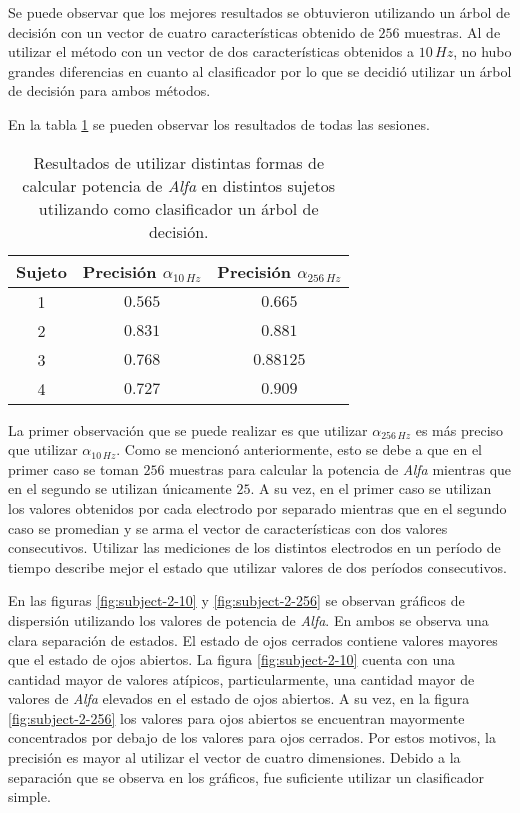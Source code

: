 Se puede observar que los mejores resultados se obtuvieron utilizando un árbol de decisión con un vector de cuatro características obtenido de $256$ muestras. Al de utilizar el método con un vector de dos características obtenidos a $10 \, Hz$, no hubo grandes diferencias en cuanto al clasificador por lo que se decidió utilizar un árbol de decisión para ambos métodos.

En la tabla \ref{tab:eeg-results} se pueden observar los resultados de todas las sesiones.

\begin{table}[H]
\centering
\begin{tabular}{ |c|c|c| } 
 \hline
 Sujeto & Precisión $\alpha_{10 \, Hz}$ &  Precisión $\alpha_{256 \, Hz}$ \\ 
 \hline
 1 & $0.565$ & $0.665$ \\
 \hline
 2 & $0.831$ & $0.881$ \\
 \hline
 3 & $0.768$ & $0.88125$ \\
 \hline
4  & $0.727$ & $0.909$ \\
 \hline



 \hline
\end{tabular}
\caption{Resultados de utilizar distintas formas de calcular potencia de \emph{Alfa} en distintos sujetos utilizando como clasificador un árbol de decisión.}
\label{tab:eeg-results}
\end{table}

La primer observación que se puede realizar es que utilizar $\alpha_{256 \, Hz}$ es más preciso que utilizar $\alpha_{10 \, Hz}$. Como se mencionó anteriormente, esto se debe a que en el primer caso se toman $256$ muestras para calcular la potencia de \emph{Alfa} mientras que en el segundo se utilizan únicamente $25$. A su vez, en el primer caso se utilizan los valores obtenidos por cada electrodo por separado mientras que en el segundo caso se promedian y se arma el vector de características con dos valores consecutivos. Utilizar las mediciones de los distintos electrodos en un período de tiempo describe mejor el estado que utilizar valores de dos períodos consecutivos.

En las figuras \ref{fig:subject-2-10} y \ref{fig:subject-2-256} se observan gráficos de dispersión utilizando los valores de potencia de \emph{Alfa}. En ambos se observa una clara separación de estados. El estado de ojos cerrados contiene valores mayores que el estado de ojos abiertos. La figura \ref{fig:subject-2-10} cuenta con una cantidad mayor de valores atípicos, particularmente, una cantidad mayor de valores de \emph{Alfa} elevados en el estado de ojos abiertos. A su vez, en la figura \ref{fig:subject-2-256} los valores para ojos abiertos se encuentran mayormente concentrados por debajo de los valores para ojos cerrados. Por estos motivos, la precisión es mayor al utilizar el vector de cuatro dimensiones. Debido a la separación que se observa en los gráficos, fue suficiente utilizar un clasificador simple.

